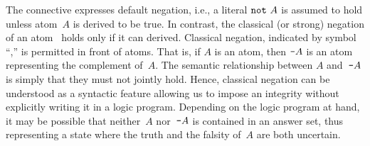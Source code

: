 The connective  expresses default negation,
i.e., a literal $\texttt{not}~A$ is assumed to hold unless atom~$A$ is derived to be true.
In contrast, the classical (or strong) negation of an atom~\cite{gellif91a} %
holds only if %
it can derived.
Classical negation, indicated by symbol ``\code{-},'' is permitted in front of atoms.
That is, if $A$ is an atom, then $\texttt{-}A$ is 
an atom representing the complement of~$A$.
The semantic relationship between $A$ and~$\texttt{-}A$
is simply that they 
must not jointly hold.
Hence,
classical negation can be understood as a syntactic feature
allowing us to impose an integrity 
without explicitly writing it in a logic program.
Depending on the logic program at hand,
it may be possible that neither~$A$ nor~$\texttt{-}A$ is contained in an answer set,
thus representing a state where the truth and the falsity of~$A$ are both uncertain.

